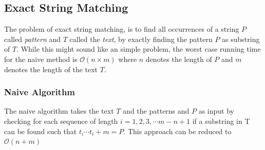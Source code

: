 \subsection{Exact String Matching}
\label{exact}
The problem of exact string matching, is to find all occurrences of a string $P$ called \textit{pattern} and $T$ called the \textit{text}, by exactly finding the pattern $P$ as substring of $T$. While this might sound like an simple problem, the worst case running time for the naive method is $\mathcal{O}({n}\times{m})$ where $n$ denotes the length of $P$ and $m$ denotes the length of the text $T$.
\subsubsection{Naive Algorithm}
The naive algorithm takes the text $T$ and the patterns and $P$ as input by checking for each sequence of length $i = 1, 2, 3, \cdots m-n+ 1 $ if a substring in T can be found such that $t_i \cdots t_i+m = P$. This approach can be reduced to $\mathcal{O}({n}+{m})$
